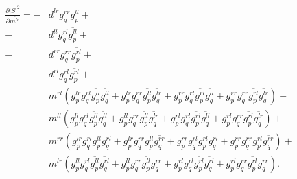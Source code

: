 \documentclass[12pt]{article}
\begin{document}
\begin{equation}
\begin{split}
\frac{\partial |S|^2}{\partial \overline{m^{lr}}} = 
	- &d^{lr} g_q^{rr} \overline{g_p^{ll}}+\\
	- &d^{ll} g_q^{rl} \overline{g_p^{ll}}+\\
	- &d^{rr} g_q^{rr} \overline{g_p^{rl}}+\\
	- &d^{rl} g_q^{rl} \overline{g_p^{rl}}+\\
	&m^{rl} \left(g_p^{lr} g_q^{rl} \overline{g_p^{ll}} \overline{g_q^{ll}} + g_p^{lr} g_q^{rr} \overline{g_p^{ll}} \overline{g_q^{lr}} + g_p^{rr} g_q^{rl} \overline{g_p^{rl}} \overline{g_q^{ll}} + g_p^{rr} g_q^{rr} \overline{g_p^{rl}} \overline{g_q^{lr}}\right)+\\
	&m^{ll} \left(g_p^{ll} g_q^{rl} \overline{g_p^{ll}} \overline{g_q^{ll}} + g_p^{ll} g_q^{rr} \overline{g_p^{ll}} \overline{g_q^{lr}} + g_p^{rl} g_q^{rl} \overline{g_p^{rl}} \overline{g_q^{ll}} + g_p^{rl} g_q^{rr} \overline{g_p^{rl}} \overline{g_q^{lr}}\right)+\\
	&m^{rr} \left(g_p^{lr} g_q^{rl} \overline{g_p^{ll}} \overline{g_q^{rl}} + g_p^{lr} g_q^{rr} \overline{g_p^{ll}} \overline{g_q^{rr}} + g_p^{rr} g_q^{rl} \overline{g_p^{rl}} \overline{g_q^{rl}} + g_p^{rr} g_q^{rr} \overline{g_p^{rl}} \overline{g_q^{rr}}\right)+\\
	&m^{lr} \left(g_p^{ll} g_q^{rl} \overline{g_p^{ll}} \overline{g_q^{rl}} + g_p^{ll} g_q^{rr} \overline{g_p^{ll}} \overline{g_q^{rr}} + g_p^{rl} g_q^{rl} \overline{g_p^{rl}} \overline{g_q^{rl}} + g_p^{rl} g_q^{rr} \overline{g_p^{rl}} \overline{g_q^{rr}}\right).
\end{split}
\end{equation}
\end{document}
